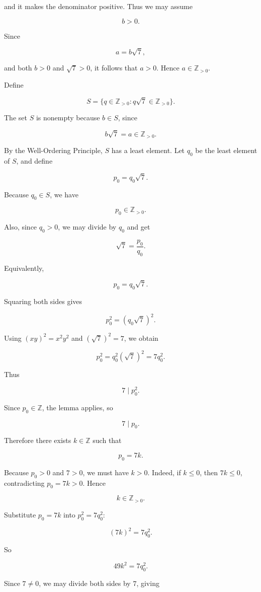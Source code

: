 and it makes the denominator positive. Thus we may assume

\[
b>0.
\]

Since

\[
a=b\sqrt 7,
\]

and both \(b>0\) and \(\sqrt 7>0\), it follows that \(a>0\). Hence \(a\in\mathbb Z_{>0}\).

Define

\[
S=\{q\in\mathbb Z_{>0}: q\sqrt 7\in\mathbb Z_{>0}\}.
\]

The set \(S\) is nonempty because \(b\in S\), since

\[
b\sqrt 7=a\in\mathbb Z_{>0}.
\]

By the Well-Ordering Principle, \(S\) has a least element. Let \(q_0\) be the least element of \(S\), and define

\[
p_0=q_0\sqrt 7.
\]

Because \(q_0\in S\), we have

\[
p_0\in\mathbb Z_{>0}.
\]

Also, since \(q_0>0\), we may divide by \(q_0\) and get

\[
\sqrt 7=\frac{p_0}{q_0}.
\]

Equivalently,

\[
p_0=q_0\sqrt 7.
\]

Squaring both sides gives

\[
p_0^2=(q_0\sqrt 7)^2.
\]

Using \((xy)^2=x^2y^2\) and \((\sqrt 7)^2=7\), we obtain

\[
p_0^2=q_0^2(\sqrt 7)^2=7q_0^2.
\]

Thus

\[
7\mid p_0^2.
\]

Since \(p_0\in\mathbb Z\), the lemma applies, so

\[
7\mid p_0.
\]

Therefore there exists \(k\in\mathbb Z\) such that

\[
p_0=7k.
\]

Because \(p_0>0\) and \(7>0\), we must have \(k>0\). Indeed, if \(k\leq 0\), then \(7k\leq 0\), contradicting \(p_0=7k>0\). Hence

\[
k\in\mathbb Z_{>0}.
\]

Substitute \(p_0=7k\) into \(p_0^2=7q_0^2\):

\[
(7k)^2=7q_0^2.
\]

So

\[
49k^2=7q_0^2.
\]

Since \(7\neq 0\), we may divide both sides by \(7\), giving

